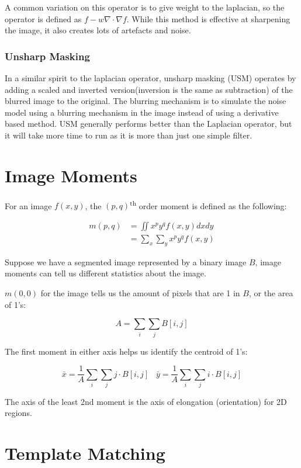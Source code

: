 \documentclass{article}
\begin{document}
\begin{multicols}{2}
A common variation on this operator is to give weight to the laplacian, so the operator is defined as $f - w \nabla \cdot \nabla f$. While this method is effective at sharpening the image, it also creates lots of artefacts and noise.

\subsubsection{Unsharp Masking}

In a similar spirit to the laplacian operator, unsharp masking (USM) operates by adding a scaled and inverted version(inversion is the same as subtraction) of the blurred image to the original. The blurring mechanism is to simulate the noise model using a blurring mechanism in the image instead of using a derivative based method. USM generally performs better than the Laplacian operator, but it will take more time to run as it is more than just one simple filter.

\section{Image Moments}

For an image $f(x,y)$, the $(p,q)$\textsuperscript{th} order moment is defined as the following:

\[
\begin{aligned}
  m(p,q) &= \iint x^p y^q f(x,y) dxdy\\
         &= \sum_x \sum_y x^p y^q f(x,y)
\end{aligned}  
\]

Suppose we have a segmented image represented by a binary image $B$, image moments can tell us different statistics about the image.

$m(0,0)$ for the image tells us the amount of pixels that are 1 in $B$, or the area of 1's:

$$
A = \sum_i \sum_j B[i,j]
$$

The first moment in either axis helps us identify the centroid of 1's:

$$
\bar x = \frac{1}{A}\sum_i \sum_j j \cdot B[i,j] \;\;\; \bar y = \frac{1}{A} \sum_i \sum_j i \cdot B[i,j]
$$

The axis of the least 2nd moment is the axis of elongation (orientation) for 2D regions.

\section{Template Matching}


\end{multicols}
\end{document}
